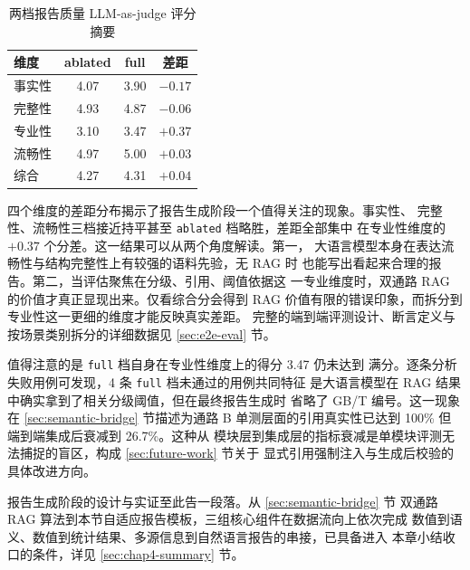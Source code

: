 \begin{table}[!ht]
    \centering
    \caption{两档报告质量 LLM-as-judge 评分摘要}
    \label{tab:report-judge-summary}
    \song\wuhao
    \begin{tabular}{lccc}
        \toprule
        维度 & ablated & full & 差距 \\
        \midrule
        事实性 & 4.07 & 3.90 & $-0.17$ \\
        完整性 & 4.93 & 4.87 & $-0.06$ \\
        专业性 & 3.10 & 3.47 & $+0.37$ \\
        流畅性 & 4.97 & 5.00 & $+0.03$ \\
        综合 & 4.27 & 4.31 & $+0.04$ \\
        \bottomrule
    \end{tabular}
\end{table}

四个维度的差距分布揭示了报告生成阶段一个值得关注的现象。事实性、
完整性、流畅性三档接近持平甚至 \texttt{ablated} 档略胜，差距全部集中
在专业性维度的 $+0.37$ 个分差。这一结果可以从两个角度解读。第一，
大语言模型本身在表达流畅性与结构完整性上有较强的语料先验，无 RAG 时
也能写出看起来合理的报告。第二，当评估聚焦在分级、引用、阈值依据这
一专业维度时，双通路 RAG 的价值才真正显现出来。仅看综合分会得到 RAG
价值有限的错误印象，而拆分到专业性这一更细的维度才能反映真实差距。
完整的端到端评测设计、断言定义与按场景类别拆分的详细数据见
\ref{sec:e2e-eval} 节。

值得注意的是 \texttt{full} 档自身在专业性维度上的得分 3.47 仍未达到
满分。逐条分析失败用例可发现，4 条 \texttt{full} 档未通过的用例共同特征
是大语言模型在 RAG 结果中确实拿到了相关分级阈值，但在最终报告生成时
省略了 GB/T 编号。这一现象在 \ref{sec:semantic-bridge} 节描述为通路 B
单测层面的引用真实性已达到 100\% 但端到端集成后衰减到 26.7\%。这种从
模块层到集成层的指标衰减是单模块评测无法捕捉的盲区，构成
\ref{sec:future-work} 节关于
显式引用强制注入与生成后校验的具体改进方向。

报告生成阶段的设计与实证至此告一段落。从 \ref{sec:semantic-bridge} 节
双通路 RAG 算法到本节自适应报告模板，三组核心组件在数据流向上依次完成
数值到语义、数值到统计结果、多源信息到自然语言报告的串接，已具备进入
本章小结收口的条件，详见 \ref{sec:chap4-summary} 节。

